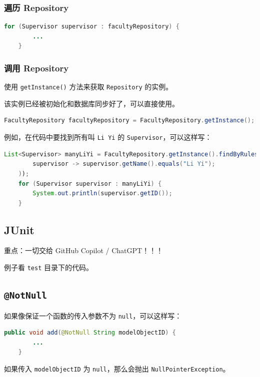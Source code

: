 \documentclass[hyperref,UTF8,12pt,a4paper]{ctexart}
\begin{document}
\subsubsection{遍历 Repository}

\begin{lstlisting}[language=Java]
	for (Supervisor supervisor : facultyRepository) {
		...
	}
\end{lstlisting}

\subsubsection{调用 Repository}

使用 \texttt{getInstance()} 方法来获取 \texttt{Repository} 的实例。

该实例已经被初始化和数据库同步好了，可以直接使用。

\begin{lstlisting}[language=Java]
	FacultyRepository facultyRepository = FacultyRepository.getInstance();
\end{lstlisting}

例如，在代码中要找到所有叫 \texttt{Li Yi} 的 \texttt{Supervisor}，可以这样写：

\begin{lstlisting}[language=Java]
	List<Supervisor> manyLiYi = FacultyRepository.getInstance().findByRules(
		supervisor -> supervisor.getName().equals("Li Yi");
	));
	for (Supervisor supervisor : manyLiYi) {
		System.out.println(supervisor.getID());
	}
\end{lstlisting}

\subsection{JUnit}

重点：一切交给 GitHub Copilot / ChatGPT！！！

例子看 \texttt{test} 目录下的代码。

\subsection{\texttt{@NotNull}}

如果像保证一个函数的传入参数不为 \texttt{null}，可以这样写：

\begin{lstlisting}[language=Java]
	public void add(@NotNull String modelObjectID) {
		...
	}
\end{lstlisting}

如果传入 \texttt{modelObjectID} 为 \texttt{null}，那么会抛出 \texttt{NullPointerException}。
\end{document}
